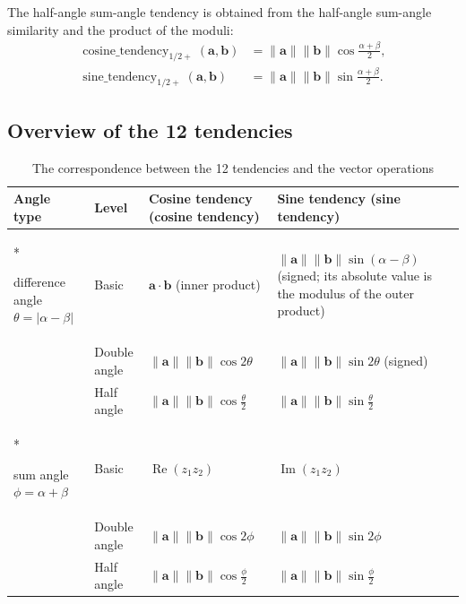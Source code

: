 \begin{definition}\label{def:half_sum_tendency}
The half-angle sum-angle tendency is obtained from the half-angle sum-angle similarity and the product of the moduli:
\begin{align*}
\operatorname{cosine\_tendency}_{1/2+}(\mathbf{a}, \mathbf{b}) &= \|\mathbf{a}\| \|\mathbf{b}\| \cos\frac{\alpha + \beta}{2}, \\
\operatorname{sine\_tendency}_{1/2+}(\mathbf{a}, \mathbf{b}) &= \|\mathbf{a}\| \|\mathbf{b}\| \sin\frac{\alpha + \beta}{2}.
\end{align*}
\end{definition}

\subsection{\texorpdfstring{Overview of the 12 tendencies}{Overview of the 12 tendencies}}

\begin{table}[htbp]
    \centering
    \caption{The correspondence between the 12 tendencies and the vector operations}
    \label{tab:tendency_spectrum}
    \begin{tabularx}{\textwidth}{>{\centering\arraybackslash}p{2.4cm}
                                >{\centering\arraybackslash}p{1.4cm}
                                >{\centering\arraybackslash}X
                                >{\centering\arraybackslash}X}
        \toprule
        Angle type & Level & Cosine tendency (cosine tendency) & Sine tendency (sine tendency) \\
        \midrule
        \multirow{3}*{\parbox{2.0cm}{\centering difference angle $\theta=\lvert\alpha-\beta\rvert$}}
        & Basic & $\mathbf{a} \cdot \mathbf{b}$ (inner product) & $\|\mathbf{a}\| \|\mathbf{b}\| \sin(\alpha-\beta)$ (signed; its absolute value is the modulus of the outer product) \\
        & Double angle & $\|\mathbf{a}\| \|\mathbf{b}\| \cos 2\theta$ & $\|\mathbf{a}\| \|\mathbf{b}\| \sin 2\theta$ (signed) \\
        & Half angle & $\|\mathbf{a}\| \|\mathbf{b}\| \cos\frac{\theta}{2}$ & $\|\mathbf{a}\| \|\mathbf{b}\| \sin\frac{\theta}{2}$ \\
        \midrule
        \multirow{3}*{\parbox{2.0cm}{\centering sum angle $\phi=\alpha+\beta$}}
        & Basic & $\operatorname{Re}(z_1 z_2)$ & $\operatorname{Im}(z_1 z_2)$ \\
        & Double angle & $\|\mathbf{a}\| \|\mathbf{b}\| \cos 2\phi$ & $\|\mathbf{a}\| \|\mathbf{b}\| \sin 2\phi$ \\
        & Half angle & $\|\mathbf{a}\| \|\mathbf{b}\| \cos\frac{\phi}{2}$ & $\|\mathbf{a}\| \|\mathbf{b}\| \sin\frac{\phi}{2}$ \\
        \bottomrule
    \end{tabularx}
\end{table}

